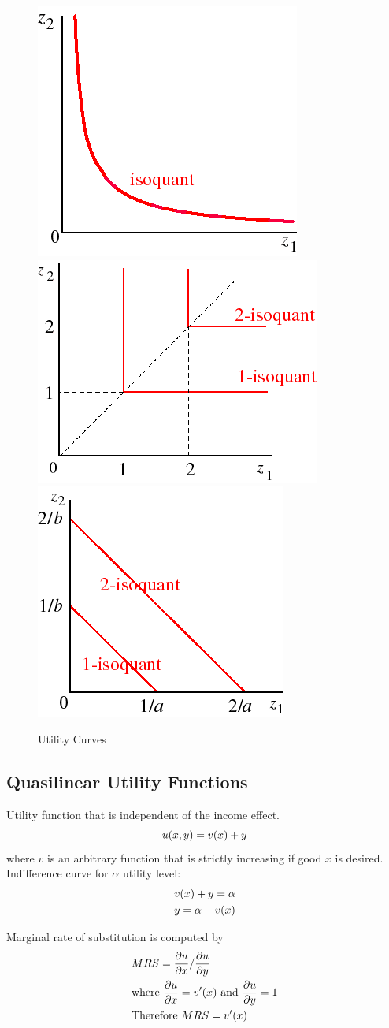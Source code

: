 \documentclass[a4paper, 12pt, reqno]{article}
\begin{document}
\begin{figure}[htp]
    \centering
    \includegraphics[width=.3\textwidth]{./Curves/CD.png}\hfill
    \includegraphics[width=.3\textwidth]{./Curves/C.png}\hfill
    \includegraphics[width=.3\textwidth]{./Curves/S.png}  
    \caption{Utility Curves}
    \label{fig:Utility Curves} 
\end{figure}  

\subsection{Quasilinear Utility Functions}
Utility function that is independent of the income effect. 
\begin{equation}
    u(x,y) = v(x) + y
    \notag
\end{equation}
where $v$ is an arbitrary function that is strictly increasing if good $x$ is desired. \\
Indifference curve for $\alpha$ utility level:
\begin{equation}
\begin{split}    
    &v(x) + y = \alpha  \\
    &y = \alpha - v(x)
    \notag 
    \end{split}   
\end{equation} 

Marginal rate of substitution is computed by 
\begin{equation}
    \begin{split}       
    &MRS =\frac{\partial u}{\partial x} / \frac{\partial u}{ \partial y } \\
    &\mbox{where } \frac{\partial u}{\partial x}=v'(x) \mbox{ and } \frac{\partial u}{\partial y} = 1 \\
    &\mbox{Therefore } MRS = v'(x)
    \notag
    \end{split}    
\end{equation}
\end{document}
